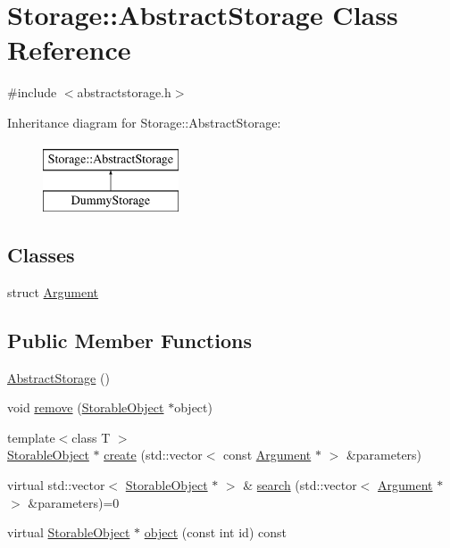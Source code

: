 \hypertarget{classStorage_1_1AbstractStorage}{
\section{Storage::AbstractStorage Class Reference}
\label{d6/da0/classStorage_1_1AbstractStorage}
}


{\ttfamily \#include $<$abstractstorage.h$>$}

Inheritance diagram for Storage::AbstractStorage:\begin{figure}[H]
\begin{center}
\leavevmode
\includegraphics[height=2.000000cm]{d6/da0/classStorage_1_1AbstractStorage}
\end{center}
\end{figure}
\subsection*{Classes}
\begin{DoxyCompactItemize}
\item 
struct \hyperlink{structStorage_1_1AbstractStorage_1_1Argument}{Argument}
\end{DoxyCompactItemize}
\subsection*{Public Member Functions}
\begin{DoxyCompactItemize}
\item 
\hyperlink{classStorage_1_1AbstractStorage_a73fd0acd5b0f71febf5254db391416c0}{AbstractStorage} ()
\item 
void \hyperlink{classStorage_1_1AbstractStorage_a5d114117d4954e01fd650251b829fdbf}{remove} (\hyperlink{classStorage_1_1StorableObject}{StorableObject} $\ast$object)
\item 
{\footnotesize template$<$class T $>$ }\\\hyperlink{classStorage_1_1StorableObject}{StorableObject} $\ast$ \hyperlink{classStorage_1_1AbstractStorage_a108af124f19c0ae9a4a461aee6abc3ec}{create} (std::vector$<$ const \hyperlink{structStorage_1_1AbstractStorage_1_1Argument}{Argument} $\ast$ $>$ \&parameters)
\item 
virtual std::vector$<$ \hyperlink{classStorage_1_1StorableObject}{StorableObject} $\ast$ $>$ \& \hyperlink{classStorage_1_1AbstractStorage_ac85363cc08204d6158d6f68d7c51764a}{search} (std::vector$<$ \hyperlink{structStorage_1_1AbstractStorage_1_1Argument}{Argument} $\ast$ $>$ \&parameters)=0
\item 
virtual \hyperlink{classStorage_1_1StorableObject}{StorableObject} $\ast$ \hyperlink{classStorage_1_1AbstractStorage_a21ff57c954664abb78d1d658a1da7afa}{object} (const int id) const 
\end{DoxyCompactItemize}
